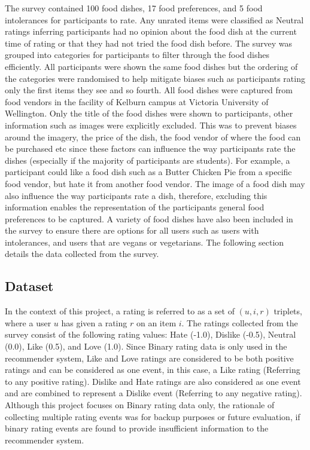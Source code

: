 The survey contained 100 food dishes, 17 food preferences, and 5 food intolerances for participants to rate. Any unrated items were classified as Neutral ratings inferring participants had no opinion about the food dish at the current time of rating or that they had not tried the food dish before. The survey was grouped into categories for participants to filter through the food dishes efficiently. All participants were shown the same food dishes but the ordering of the categories were randomised to help mitigate biases such as participants rating only the first items they see and so fourth. All food dishes were captured from food vendors in the facility of Kelburn campus at Victoria University of Wellington. Only the title of the food dishes were shown to participants, other information such as images were explicitly excluded. This was to prevent biases around the imagery, the price of the dish, the food vendor of where the food can be purchased etc since these factors can influence the way participants rate the dishes (especially if the majority of participants are students). For example, a participant could like a food dish such as a Butter Chicken Pie from a specific food vendor, but hate it from another food vendor. The image of a food dish may also influence the way participants rate a dish, therefore, excluding this information enables the representation of the participants general food preferences to be captured. A variety of food dishes have also been included in the survey to ensure there are options for all users such as users with intolerances, and users that are vegans or vegetarians. The following section details the data collected from the survey. 

\subsection{Dataset} \label{dataset}

In the context of this project, a rating is referred to as a set of $(u, i, r)$ triplets, where a user $u$ has given a rating $r$ on an item $i$. 
The ratings collected from the survey consist of the following rating values: Hate (-1.0), Dislike (-0.5), Neutral (0.0), Like (0.5), and Love (1.0). Since Binary rating data is only used in the recommender system, Like and Love ratings are considered to be both positive ratings and can be considered as one event, in this case, a Like rating (Referring to any positive rating). Dislike and Hate ratings are also considered as one event and are combined to represent a Dislike event (Referring to any negative rating). Although this project focuses on Binary rating data only, the rationale of collecting multiple rating events was for backup purposes or future evaluation, if binary rating events are found to provide insufficient information to the recommender system. 


